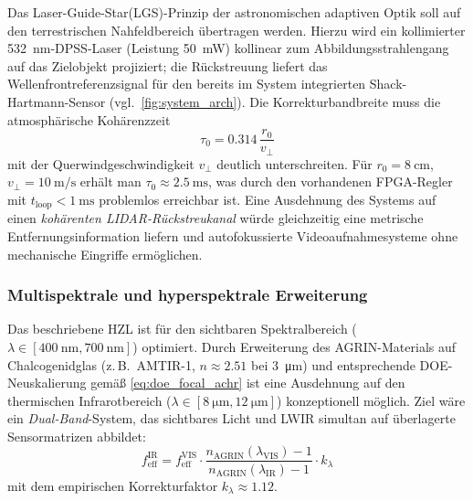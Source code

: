 ﻿\documentclass[12pt,a4paper]{article}
\theoremstyle{definition}
\newcommand{\eff}{\mathrm{eff}}
\begin{document}
	Das Laser-Guide-Star(LGS)-Prinzip der astronomischen adaptiven Optik
	soll auf den terrestrischen Nahfeldbereich übertragen werden.
	Hierzu wird ein kollimierter \SI{532}{\nano\metre}-DPSS-Laser
	(Leistung \SI{50}{\milli\watt}) kollinear zum Abbildungsstrahlengang
	auf das Zielobjekt projiziert; die Rückstreuung liefert das
	Wellenfrontreferenzsignal für den bereits im System integrierten
	Shack-Hartmann-Sensor (vgl.\ \cref{fig:system_arch}).  Die
	Korrekturbandbreite muss die atmosphärische Kohärenzzeit
	\begin{equation}
		\tau_0 = 0.314\,\frac{r_0}{v_\perp}
		\label{eq:tau0}
	\end{equation}
	mit der Querwindgeschwindigkeit $v_\perp$ deutlich unterschreiten.
	Für $r_0 = \SI{8}{\centi\metre}$, $v_\perp = \SI{10}{\metre\per\second}$
	erhält man $\tau_0 \approx \SI{2.5}{\milli\second}$, was durch den
	vorhandenen FPGA-Regler mit $t_\mathrm{loop} < \SI{1}{\milli\second}$
	problemlos erreichbar ist.  Eine Ausdehnung des Systems auf einen
	\emph{kohärenten LIDAR-Rückstreukanal} würde gleichzeitig eine
	metrische Entfernungsinformation liefern und autofokussierte
	Videoaufnahmesysteme ohne mechanische Eingriffe ermöglichen.

	\subsubsection{Multispektrale und hyperspektrale Erweiterung}

	Das beschriebene HZL ist für den sichtbaren Spektralbereich
	($\lambda \in [\SI{400}{\nano\metre}, \SI{700}{\nano\metre}]$)
	optimiert.  Durch Erweiterung des AGRIN-Materials auf Chalcogenidglas
	(z.\,B.\ AMTIR-1, $n \approx 2.51$ bei \SI{3}{\micro\metre}) und
	entsprechende DOE-Neuskalierung gemäß \eqref{eq:doe_focal_achr}
	ist eine Ausdehnung auf den thermischen Infrarotbereich
	($\lambda \in [\SI{8}{\micro\metre}, \SI{12}{\micro\metre}]$)
	konzeptionell möglich.  Ziel wäre ein \emph{Dual-Band}-System, das
	sichtbares Licht und LWIR simultan auf überlagerte Sensormatrizen
	abbildet:
	\begin{equation}
		f_\eff^\mathrm{IR}
		= f_\eff^\mathrm{VIS}\cdot\frac{n_\mathrm{AGRIN}(\lambda_\mathrm{VIS}) - 1}
		{n_\mathrm{AGRIN}(\lambda_\mathrm{IR}) - 1}
		\cdot k_\lambda
		\label{eq:dual_band}
	\end{equation}
	mit dem empirischen Korrekturfaktor $k_\lambda \approx 1.12$.
\end{document}
